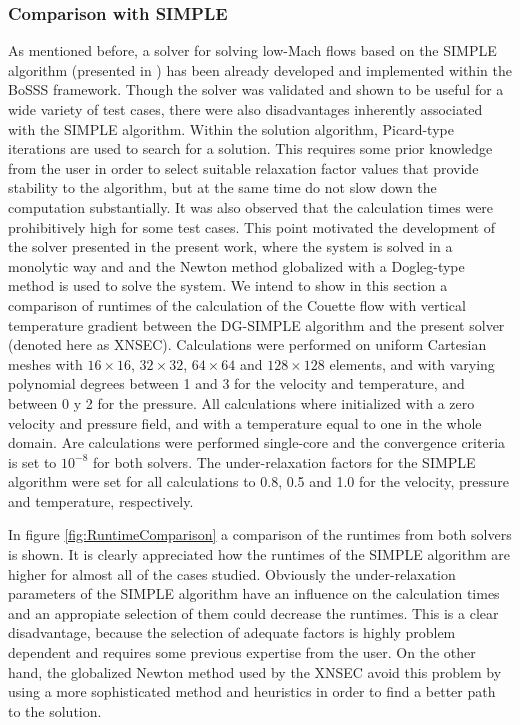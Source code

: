 \subsubsection{Comparison with SIMPLE}
As mentioned before, a solver for solving low-Mach flows based on the SIMPLE algorithm (presented in \cite{kleinHighorderDiscontinuousGalerkin2016}) has been already developed and implemented within the BoSSS framework. 
Though the solver was validated and shown to be useful for a wide variety of test cases, there were also disadvantages inherently associated with the SIMPLE algorithm. Within the solution algorithm, Picard-type iterations are used to search for a solution. This requires some prior knowledge from the user in order to select suitable relaxation factor values that provide stability to the algorithm, but at the same time do not slow down the computation substantially.
It was also observed that the calculation times were prohibitively high for some test cases. This point motivated the development of the solver presented in the present work, where the system is solved in a monolytic way and  and the Newton method globalized with a Dogleg-type method is used to solve the system.  
We intend to show in this section a comparison of runtimes of the calculation of the Couette flow with vertical temperature gradient between the DG-SIMPLE algorithm \citep{kleinHighorderDiscontinuousGalerkin2016} and the present solver (denoted here as XNSEC). Calculations were performed on uniform Cartesian meshes with $16\times16$, $32\times32$, $64\times64$ and $128\times128$ elements, and with varying polynomial degrees between 1 and 3 for the velocity and temperature, and between 0 y 2 for the pressure. All calculations where initialized with a zero velocity and pressure field, and with a temperature equal to one in the whole domain. Are calculations were performed single-core and the convergence criteria is set to $10^{-8}$ for both solvers. The under-relaxation factors for the SIMPLE algorithm were set for all calculations to 0.8, 0.5 and 1.0 for the velocity, pressure and temperature, respectively. 

In figure \cref{fig:RuntimeComparison} a comparison of the runtimes from both solvers is shown. It is clearly  appreciated how the runtimes of the SIMPLE algorithm are higher for almost all of the cases studied. Obviously the under-relaxation parameters of the SIMPLE algorithm have an influence on the calculation times and an appropiate selection of them could decrease the runtimes. This is a clear disadvantage, because the selection of adequate factors is highly problem dependent and requires some previous expertise from the user. On the other hand, the globalized Newton method used by the XNSEC avoid this problem by using a more sophisticated method and heuristics in order to find a better path to the solution. 

